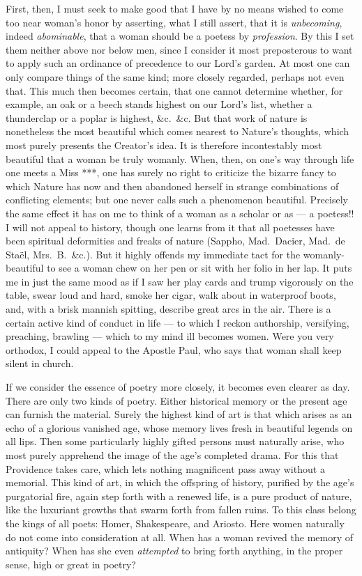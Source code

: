 \documentclass[12pt]{article}
\newcommand{\opage}[1]{\marginnote{\footnotesize\textit{[#1]}}}
\begin{document}
First, then, I must seek to make good that I have by no means wished to come too
near woman's honor by asserting, what I still assert, that it is \emph{unbecoming},
indeed \emph{abominable}, that a woman should be a poetess by \emph{profession}. By
this I set them neither above nor below men, since I consider it most preposterous
to want to apply such an ordinance of precedence to our Lord's garden. At most one
can only compare things of the same kind; more closely regarded, perhaps not even
that. This much then becomes certain, that one cannot determine whether, for
example, an oak or a beech stands highest on our Lord's list, whether a thunderclap
or a poplar is highest, \&c.\ \&c. But that work of nature is nonetheless the most
beautiful which comes nearest to Nature's thoughts, which most purely presents the
Creator's idea. It is therefore incontestably most beautiful that a woman be truly
womanly. When, then, on one's way through life one meets a Miss ***, one has surely
no right to criticize the bizarre fancy to which Nature has now and then abandoned
herself in strange combinations of conflicting elements; but one never calls such a
phenomenon beautiful. Precisely the same effect it has on me to think of a woman as
a scholar or as --- a poetess!! I will not appeal to history, though one learns from
it that all poetesses have been spiritual deformities and freaks of nature (Sappho,
Mad.\ Dacier, Mad.\ de Staël, Mrs.\ B.\ \&c.). But it highly offends my immediate
tact for the womanly-beautiful to see a woman chew \opage{11}on her pen or sit with
her folio in her lap. It puts me in just the same mood as if I saw her play cards
and trump vigorously on the table, swear loud and hard, smoke her cigar, walk about
in waterproof boots, and, with a brisk mannish spitting, describe great arcs in the
air. There is a certain active kind of conduct in life --- to which I reckon
authorship, versifying, preaching, brawling --- which to my mind ill becomes women.
Were you very orthodox, I could appeal to the Apostle Paul, who says that woman
shall keep silent in church.

If we consider the essence of poetry more closely, it becomes even clearer as day.
There are only two kinds of poetry. Either historical memory or the present age can
furnish the material. Surely the highest kind of art is that which arises as an
echo of a glorious vanished age, whose memory lives fresh in beautiful legends on
all lips. Then some particularly highly gifted persons must naturally arise, who
most purely apprehend the image of the age's completed drama. For this that
Providence takes care, which lets nothing magnificent pass away without a memorial.
This kind of art, in which the offspring of history, purified by the age's
purgatorial fire, again step forth with a renewed life, is a pure product of
nature, like the luxuriant growths that swarm forth from fallen ruins. To this
class belong the kings of all poets: Homer, Shakespeare, and Ariosto. Here women
naturally do not come into consideration at all. When has a woman revived the
memory of antiquity? When has she even \emph{attempted} to bring forth anything, in
the proper sense, high or great in poetry?
\end{document}
